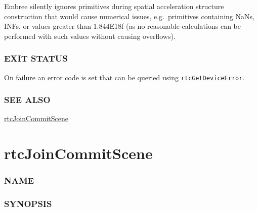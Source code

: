 Embree silently ignores primitives during spatial acceleration structure
construction that would cause numerical issues, e.g.~primitives
containing NaNs, INFs, or values greater than 1.844E18f (as no
reasonable calculations can be performed with such values without
causing overflows).

\subsubsection{EXIT STATUS}\label{exit-status}

On failure an error code is set that can be queried using
\texttt{rtcGetDeviceError}.

\subsubsection{SEE ALSO}\label{see-also}

\hyperref[rtcjoincommitscene]{rtcJoinCommitScene}

\pagebreak

\section{rtcJoinCommitScene}\label{rtcjoincommitscene}

\subsubsection{NAME}\label{name}

\begin{Shaded}
\begin{Highlighting}[]
\OperatorTok{{-}}
\end{Highlighting}
\end{Shaded}

\subsubsection{SYNOPSIS}\label{synopsis}

\begin{Shaded}
\begin{Highlighting}[]

\OperatorTok{(}\OperatorTok{);}
\end{Highlighting}
\end{Shaded}

